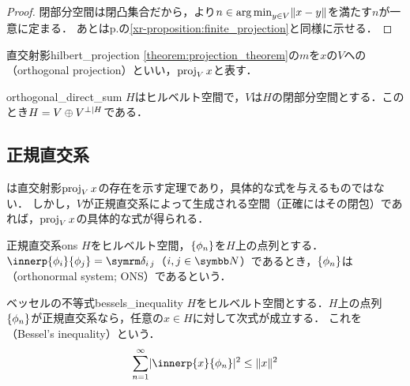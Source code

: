 \documentclass[../../main]{subfiles}
\begin{document}
\begin{proof}
  閉部分空間は閉凸集合だから，より\(n\in\operatorname*{arg\,min}_{y\in V}\lVert x-y\rVert\)を満たす\(n\)が一意に定まる．
  あとはp.\pageref{xr-proposition:finite_projection}の\cref{xr-proposition:finite_projection}と同様に示せる．
\end{proof}

\begin{definition}{直交射影}{hilbert_projection}
  \cref{theorem:projection_theorem}の\(m\)を\(x\)の\(V\)への（orthogonal projection）といい，\(\operatorname{proj}_Vx\)と表す．
\end{definition}

\begin{proposition}{}{orthogonal_direct_sum}
  \(H\)はヒルベルト空間で，\(V\)は\(H\)の閉部分空間とする．このとき\(H=V\oplus\pcomp[H]{V}\)である．
\end{proposition}

\subsection{正規直交系}

は直交射影\(\operatorname{proj}_Vx\)の存在を示す定理であり，具体的な式を与えるものではない．
しかし，\(V\)が正規直交系によって生成される空間（正確にはその閉包）であれば，\(\operatorname{proj}_Vx\)の具体的な式が得られる．

\begin{definition}{正規直交系}{ons}
  \(H\)をヒルベルト空間，\(\lbrace\phi_n\rbrace\)を\(H\)上の点列とする．\(\innerp{\phi_i}{\phi_j}=\kdelta{i}{j}\)（\(i,j\in\numset{N}\)）であるとき，\(\lbrace\phi_n\rbrace\)は（orthonormal system; ONS）であるという．
\end{definition}

\begin{theorem}{ベッセルの不等式}{bessels_inequality}
  \(H\)をヒルベルト空間とする．\(H\)上の点列\(\lbrace\phi_n\rbrace\)が正規直交系なら，任意の\(x\in H\)に対して次式が成立する．
  これを（Bessel's inequality）という．
  \begin{equation}
    \label{equation:bessels_inequality}
    \sum_{n=1}^\infty\abs{\innerp{x}{\phi_n}}^2 \leq \vnorm{x}^2
  \end{equation}
\end{theorem}
\end{document}
